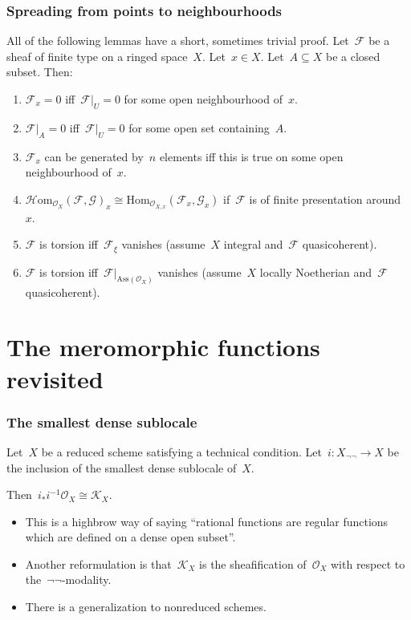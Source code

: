 \documentclass[12pt,utf8,notheorems,compress,t]{beamer}
\newcommand{\F}{\mathcal{F}}
\renewcommand{\G}{\mathcal{G}}
\renewcommand{\O}{\mathcal{O}}
\newcommand{\K}{\mathcal{K}}
\newcommand{\Hom}{\mathrm{Hom}}
\renewcommand{\_}{\mathpunct{.}}
\newcommand{\?}{\,{:}\,}
\begin{document}
\begin{frame}\frametitle{Spreading from points to neighbourhoods}
  All of the following lemmas have a short, sometimes trivial proof.
  Let~$\F$ be a sheaf of finite type on a ringed space~$X$.
  Let~$x \in X$. Let~$A \subseteq X$ be a closed subset. Then:
  \small
  \begin{enumerate}
    \item $\F_x = 0$ iff~$\F|_U = 0$ for some open neighbourhood of~$x$.
    \item $\F|_A = 0$ iff~$\F|_U = 0$ for some open set containing~$A$.
    \item $\F_x$ can be generated by~$n$ elements iff this is true on some open
    neighbourhood of~$x$.
    \item $\mathcal{H}\mathrm{om}_{\O_X}(\F,\G)_x \cong
    \Hom_{\O_{X,x}}(\F_x,\G_x)$ if~$\F$ is of finite presentation around~$x$.
    \item $\F$ is torsion iff~$\F_\xi$ vanishes (assume~$X$ integral and~$\F$ quasicoherent).
    \item $\F$ is torsion iff~$\F|_{\mathrm{Ass}(\O_X)}$ vanishes (assume~$X$
    locally Noetherian and~$\F$ quasicoherent).
  \end{enumerate}
\end{frame}



\section{The meromorphic functions revisited}

\begin{frame}\frametitle{The smallest dense sublocale}\justifying
  Let~$X$ be a reduced scheme satisfying a technical condition.
  Let~$i : X_{\neg\neg} \to X$ be the inclusion of the smallest dense sublocale
  of~$X$.

  Then~$i_* i^{-1} \O_X \cong \K_X$.

  \begin{itemize}\justifying
    \item This is a highbrow way of saying ``rational functions are regular
    functions which are defined on a dense open subset''.
    \item Another reformulation is that~$\K_X$ is the sheafification of~$\O_X$
    with respect to the~$\neg\neg$-modality.
    \item There is a generalization to nonreduced schemes.
  \end{itemize}
\end{frame}
\end{document}
